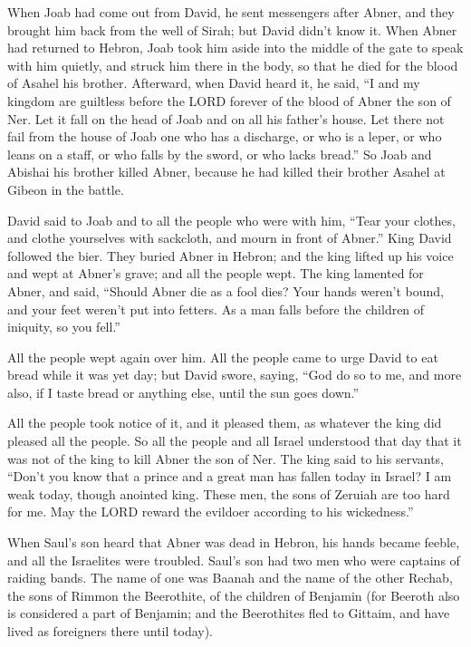 \myverse{}When Joab had come out from David, he sent messengers after Abner,
and they brought him back from the well of Sirah; but David didn’t know it.
\myverse{}When Abner had returned to Hebron, Joab took him aside into the middle of
the gate to speak with him quietly, and struck him there in the body, so that he died for the blood of
Asahel his brother.
\myverse{}Afterward, when David heard it, he said, “I and my kingdom are guiltless before
the LORD forever of the blood of Abner the son of Ner.
\myverse{}Let it fall on the head of Joab and on all his father’s house. Let there not
fail from the house of Joab one who has a discharge, or who is a leper, or who leans on a staff, or who
falls by the sword, or who lacks bread.”
\myverse{}So Joab and Abishai his brother killed Abner, because he had killed their
brother Asahel at Gibeon in the battle.

\myverse{}David said to Joab and to all the people who were with him, “Tear
your clothes, and clothe yourselves with sackcloth, and mourn in front of Abner.” King David followed
the bier.
\myverse{}They buried Abner in Hebron; and the king lifted up his voice and wept at
Abner’s grave; and all the people wept.
\myverse{}The king lamented for Abner, and said, “Should Abner die as a fool dies?
\myverse{}Your hands weren’t bound, and your feet weren’t put into fetters. As a man
falls before the children of iniquity, so you fell.”

All the people wept again over him.
\myverse{}All the people came to urge David to eat bread while it was yet day; but David
swore, saying, “God do so to me, and more also, if I taste bread or anything else, until the sun goes
down.”

\myverse{}All the people took notice of it, and it pleased them, as whatever
the king did pleased all the people.
\myverse{}So all the people and all Israel understood that day that it was not of the
king to kill Abner the son of Ner.
\myverse{}The king said to his servants, “Don’t you know that a prince and a great man
has fallen today in Israel?
\myverse{}I am weak today, though anointed king. These men, the sons of Zeruiah are
too hard for me. May the LORD reward the evildoer according to his wickedness.”


\mychapter{} \myverse*{}When Saul’s son heard that Abner was dead in Hebron, his hands
became feeble, and all the Israelites were troubled.
\myverse{}Saul’s son had two men who were captains of raiding bands. The name of one was
Baanah and the name of the other Rechab, the sons of Rimmon the Beerothite, of the children of Benjamin
(for Beeroth also is considered a part of Benjamin;
\myverse{}and the Beerothites fled to Gittaim, and have lived as foreigners there until
today).


